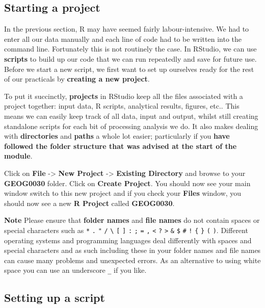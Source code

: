 \documentclass[
]{book}
\begin{document}
\hypertarget{starting-a-project}{%
\subsection{Starting a project}\label{starting-a-project}}

In the previous section, R may have seemed fairly labour-intensive. We had to enter all our data manually and each line of code had to be written into the command line. Fortunately this is not routinely the case. In RStudio, we can use \textbf{scripts} to build up our code that we can run repeatedly and save for future use. Before we start a new script, we first want to set up ourselves ready for the rest of our practicals by \textbf{creating a new project}.

To put it succinctly, \textbf{projects} in RStudio keep all the files associated with a project together: input data, R scripts, analytical results, figures, etc.. This means we can easily keep track of all data, input and output, whilst still creating standalone scripts for each bit of processing analysis we do. It also makes dealing with \textbf{directories} and \textbf{paths} a whole lot easier; particularly if you \textbf{have followed the folder structure that was advised at the start of the module}.

Click on \textbf{File} -\textgreater{} \textbf{New Project} -\textgreater{} \textbf{Existing Directory} and browse to your \textbf{GEOG0030} folder. Click on \textbf{Create Project}. You should now see your main window switch to this new project and if you check your \textbf{Files} window, you should now see a new \textbf{R Project} called \textbf{GEOG0030}.

\textbf{Note}
Please ensure that \textbf{folder names} and \textbf{file names} do not contain spaces or special characters such as \texttt{*} \texttt{.} \texttt{"} \texttt{/} \texttt{\textbackslash{}} \texttt{{[}} \texttt{{]}} \texttt{:} \texttt{;} \texttt{\textbar{}} \texttt{=} \texttt{,} \texttt{\textless{}} \texttt{?} \texttt{\textgreater{}} \texttt{\&} \texttt{\$} \texttt{\#} \texttt{!} \texttt{\textquotesingle{}} \texttt{\{} \texttt{\}} \texttt{(} \texttt{)}. Different operating systems and programming languages deal differently with spaces and special characters and as such including these in your folder names and file names can cause many problems and unexpected errors. As an alternative to using white space you can use an underscore \texttt{\_} if you like.

\hypertarget{setting-up-a-script}{%
\subsection{Setting up a script}\label{setting-up-a-script}}
\end{document}
